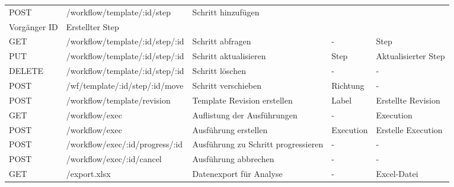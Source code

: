 \begin{small}
\begin{landscape}
\begin{longtable}{l|l|l|l|l}
POST          & /workflow/template/:id/step     & Schritt hinzufügen                  & \begin{tabular}[c]{@{}l@{}}Step\\ Vorgänger ID\end{tabular} & Erstellter Step                                                         \\ \hline
GET           & /workflow/template/:id/step/:id & Schritt abfragen                    & -                                                           & Step                                                                    \\ \hline
PUT           & /workflow/template/:id/step/:id & Schritt aktualisieren               & Step                                                        & Aktualisierter Step                                                     \\ \hline
DELETE        & /workflow/template/:id/step/:id & Schritt löschen                     & -                                                           & -                                                                       \\ \hline
POST          & /wf/template/:id/step/:id/move  & Schritt verschieben                 & Richtung                                                    & -                                                                       \\ \hline
POST          & /workflow/template/revision     & Template Revision erstellen         & Label                                                       & Erstellte Revision                                                      \\ \hline
GET           & /workflow/exec                  & Auflistung der Ausführungen         & -                                                           & Execution                                                               \\ \hline
POST          & /workflow/exec                  & Ausführung erstellen                & Execution                                                   & Erstelle Execution                                                      \\ \hline
POST          & /workflow/exec/:id/progress/:id & Ausführung zu Schritt progressieren & -                                                           & -                                                                       \\ \hline
POST          & /workflow/exec/:id/cancel       & Ausführung abbrechen                & -                                                           & - \\ \hline
GET           & /export.xlsx                    & Datenexport für Analyse             & -                                                           & Excel-Datei
\end{longtable}
\end{landscape}
\end{small}

